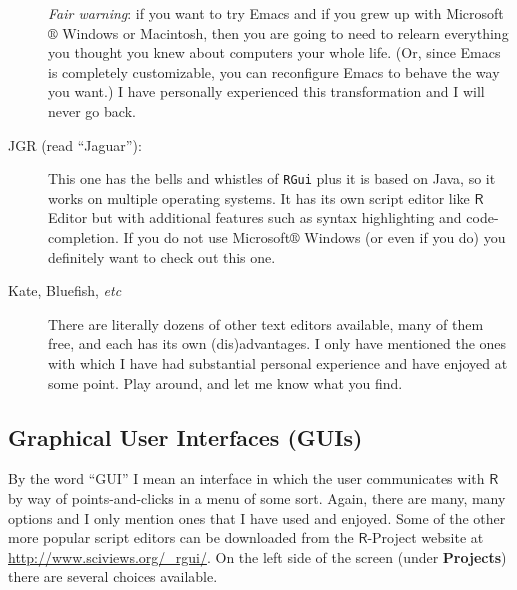 \documentclass[captions=tableheading]{scrbook}
\begin{document}
\begin{description}
     \emph{Fair warning}: if you want to try Emacs and if you grew up with Microsoft\(\circledR\) Windows or Macintosh, then you are going to need to relearn everything you thought you knew about computers your whole life. (Or, since Emacs is completely customizable, you can reconfigure Emacs to behave the way you want.) I have personally experienced this transformation and I will never go back.
\item[JGR (read ``Jaguar''):\index{JGR}] This one has the bells and whistles of \texttt{RGui} plus it is based on Java, so it works on multiple operating systems. It has its own script editor like \(\mathsf{R}\) Editor but with additional features such as syntax highlighting and code-completion. If you do not use Microsoft\(\circledR\) Windows (or even if you do) you definitely want to check out this one.
\item[Kate, Bluefish, \emph{etc}] There are literally dozens of other text editors available, many of them free, and each has its own (dis)advantages. I only have mentioned the ones with which I have had substantial personal experience and have enjoyed at some point. Play around, and let me know what you find.
\end{description}
\subsection{Graphical User Interfaces (GUIs)}
\label{sec-2-2-3}


By the word ``GUI'' I mean an interface in which the user communicates with \(\mathsf{R}\) by way of points-and-clicks in a menu of some sort. Again, there are many, many options and I only mention ones that I have used and enjoyed. Some of the other more popular script editors can be downloaded from the \(\mathsf{R}\)-Project website at \href{http://www.sciviews.org/_rgui/}{http://www.sciviews.org/\_rgui/}. On the left side of the screen (under \textbf{Projects}) there are several choices available. 
\end{document}
